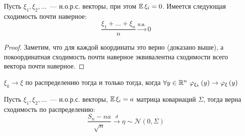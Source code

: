 \begin{theorem}[УЗБЧ]

Пусть $\xi_1, \xi_2, \ldots$~--- н.о.р.с. векторы, при этом $\operatorname{\mathbb{E}}\xi_i = 0$. Имеется следующая сходимость почти наверное:
$$
\frac{\xi_1 + \ldots + \xi_n}{n} \xrightarrow[]{\text{п.н.}}  0
$$
\end{theorem}

\begin{proof} Заметим, что для каждой координаты это верно (доказано выше), а покоординатная сходимость почти наверное эквивалентна сходимости всего вектора почти наверное.\end{proof}

\begin{lemma} $\xi_k \to \xi$ по распределению тогда и только тогда, когда $\forall y \in \mathbb{R}^n \ \varphi_{\xi_k}\left({y}\right) \to \varphi_{\xi}\left({y}\right)$
\end{lemma}

\begin{theorem} Пусть $\xi_1, \xi_2, \ldots$~--- н.о.р.с. векторы, $\operatorname{\mathbb{E}}\xi_i = a$ матрица ковариаций $\Sigma$, тогда верна сходимость по распределению:
$$
\frac{S_n - na}{\sqrt{n}} \xrightarrow[]{d} \eta \sim \mathcal{N}(0, \Sigma)
$$
\end{theorem}